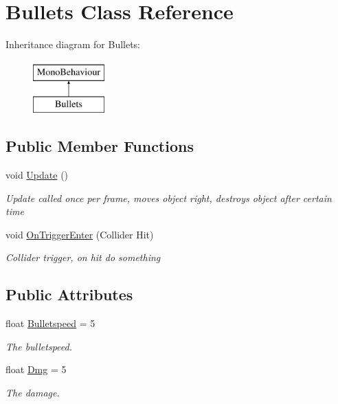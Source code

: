 \hypertarget{classBullets}{\section{Bullets Class Reference}
\label{classBullets}
}
Inheritance diagram for Bullets\-:\begin{figure}[H]
\begin{center}
\leavevmode
\includegraphics[height=2.000000cm]{classBullets}
\end{center}
\end{figure}
\subsection*{Public Member Functions}
\begin{DoxyCompactItemize}
\item 
void \hyperlink{classBullets_a5f8f1e6e26692c4309d245bfc82f262d}{Update} ()
\begin{DoxyCompactList}\small\item\em Update called once per frame, moves object right, destroys object after certain time \end{DoxyCompactList}\item 
void \hyperlink{classBullets_a15349b695ed15b96eda82606d5da773e}{On\-Trigger\-Enter} (Collider Hit)
\begin{DoxyCompactList}\small\item\em Collider trigger, on hit do something \end{DoxyCompactList}\end{DoxyCompactItemize}
\subsection*{Public Attributes}
\begin{DoxyCompactItemize}
\item 
float \hyperlink{classBullets_a9120f537885ce71eb6bda1fdc4c4bdba}{Bulletspeed} = 5
\begin{DoxyCompactList}\small\item\em The bulletspeed. \end{DoxyCompactList}\item 
float \hyperlink{classBullets_acc3d972e4c08788a0aff8b87faf7c3a6}{Dmg} = 5
\begin{DoxyCompactList}\small\item\em The damage. \end{DoxyCompactList}\end{DoxyCompactItemize}


